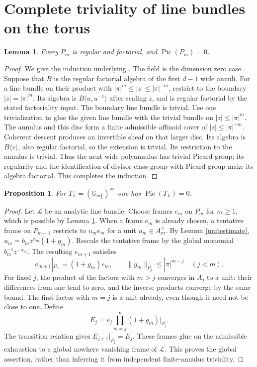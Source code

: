 \documentclass[11pt]{article}
\newtheorem{lemma}[theorem]{Lemma}
\newtheorem{proposition}[theorem]{Proposition}
\theoremstyle{remark}\newtheorem{remark}[theorem]{Remark}
\newcommand{\an}{\mathrm{an}}
\newcommand{\Gm}{\mathbb G_m}
\newcommand{\Pic}{\operatorname{Pic}}
\begin{document}
\section{Complete triviality of line bundles on the torus}
\begin{lemma}\label{finitepic}
Every $P_m$ is regular and factorial, and $\Pic(P_m)=0$.
\end{lemma}
\begin{proof}
We give the induction underlying \cite[3.4.9]{vdP}. The field is the
dimension zero case. Suppose that $B$ is the regular factorial algebra
of the first $d-1$ wide annuli. For a line bundle on their product with
$|\pi|^m\le|z|\le|\pi|^{-m}$, restrict to the boundary $|z|=|\pi|^m$.
Its algebra is $B\langle u,u^{-1}\rangle$ after scaling $z$, and is
regular factorial by the stated factoriality input. The boundary line
bundle is trivial. Use one trivialization to glue the given line bundle
with the trivial bundle on $|z|\le|\pi|^m$. The annulus and this disc
form a finite admissible affinoid cover of $|z|\le|\pi|^{-m}$.
Coherent descent produces an invertible sheaf on that larger disc.
Its algebra is $B\langle v\rangle$, also regular factorial, so the
extension is trivial. Its restriction to the annulus is trivial.
Thus the next wide polyannulus has trivial Picard group; its regularity
and the identification of divisor class group with Picard group make
its algebra factorial. This completes the induction.
\end{proof}

\begin{proposition}\label{globalpic}
For $T_L=(\Gm_L^d)^{\an}$ one has $\Pic(T_L)=0$.
\end{proposition}
\begin{proof}
Let $\mathscr L$ be an analytic line bundle. Choose frames $e_m$ on
$P_m$ for $m\ge1$, which is possible by Lemma \ref{finitepic}.
When a frame $e_m$ is already chosen, a tentative frame on $P_{m+1}$
restricts to $u_me_m$ for a unit $u_m\in A_m^\times$.
By Lemma \ref{unitestimate}, $u_m=b_mz^{\alpha_m}(1+g_m)$.
Rescale the tentative frame by the global monomial $b_m^{-1}z^{-\alpha_m}$.
The resulting $e_{m+1}$ satisfies
\[
 e_{m+1}|_{P_m}=(1+g_m)e_m,\qquad
 \|g_m\|_{P_j}\le |\pi|^{m-j}\quad(j<m).
\]
For fixed $j$, the product of the factors with $m>j$ converges in
$A_j$ to a unit: their differences from one tend to zero, and the
inverse products converge by the same bound. The first factor with
$m=j$ is a unit already, even though it need not be close to one.
Define
\[
 E_j=e_j\prod_{m=j}^{\infty}(1+g_m)|_{P_j}.
\]
The transition relation gives $E_{j+1}|_{P_j}=E_j$.
These frames glue on the admissible exhaustion to a global nowhere
vanishing frame of $\mathscr L$. This proves the global assertion,
rather than inferring it from independent finite-annulus triviality.
\end{proof}
\end{document}
